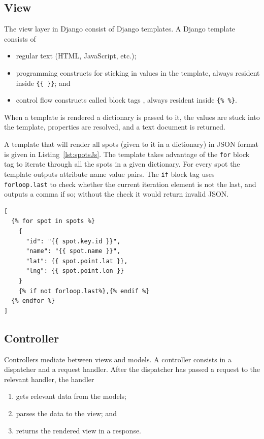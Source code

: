 \subsection{View}
\label{sec:view}
The view layer in Django consist of Django templates. A Django template consists
of
\begin{itemize}
  \item regular text (HTML, JavaScript, etc.);
  \item programming constructs for sticking in values in the template, always
  resident inside \verb|{{ }}|; and
  \item control flow constructs called block tags \citep{django:templates},
always resident inside \verb|{% %}|.
\end{itemize}
When a template is rendered a dictionary is passed to it, the values are stuck
into the template, properties are resolved, and a text document is returned.  

A template that will render all spots (given to it in a dictionary) in JSON
 format is given in Listing~\ref{lst:spotsJs}. The template takes advantage of
 the \verb|for| block tag to iterate through all the spots in a given
 dictionary. For every spot the template outputs attribute name value pairs. The
 \verb|if| block tag uses \verb|forloop.last| to check whether the current
 iteration element is not the last, and outputs a comma if so; without the check
 it would return invalid JSON.


\begin{lstlisting}[caption=Django template,label=lst:spotsJs]
[ 
  {% for spot in spots %}
    {
      "id": "{{ spot.key.id }}",
      "name": "{{ spot.name }}",
      "lat": {{ spot.point.lat }},
      "lng": {{ spot.point.lon }}
    }
    {% if not forloop.last%},{% endif %}
  {% endfor %}
]
\end{lstlisting}

\subsection{Controller}\label{sec:controller}
Controllers mediate between views and models. A controller consists in a
dispatcher and a request handler. After the dispatcher has passed a request to
the relevant handler, the handler 
\begin{enumerate}
  \item gets relevant data from the models;
  \item parses the data to the view; and
  \item returns the rendered view in a response.
\end{enumerate}

